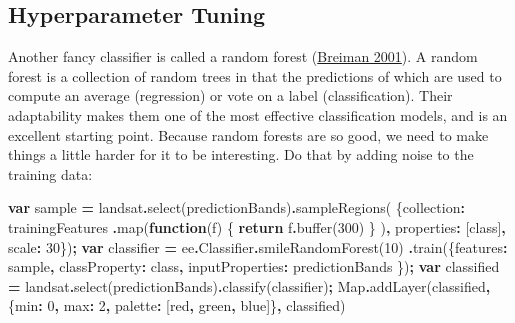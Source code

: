 \documentclass[
]{article}
\newenvironment{Shaded}{\begin{snugshade}}{\end{snugshade}}
\newcommand{\AttributeTok}[1]{\textcolor[rgb]{0.77,0.63,0.00}{#1}}
\newcommand{\BuiltInTok}[1]{#1}
\newcommand{\ControlFlowTok}[1]{\textcolor[rgb]{0.13,0.29,0.53}{\textbf{#1}}}
\newcommand{\DataTypeTok}[1]{\textcolor[rgb]{0.13,0.29,0.53}{#1}}
\newcommand{\DecValTok}[1]{\textcolor[rgb]{0.00,0.00,0.81}{#1}}
\newcommand{\FunctionTok}[1]{\textcolor[rgb]{0.00,0.00,0.00}{#1}}
\newcommand{\KeywordTok}[1]{\textcolor[rgb]{0.13,0.29,0.53}{\textbf{#1}}}
\newcommand{\NormalTok}[1]{#1}
\newcommand{\OperatorTok}[1]{\textcolor[rgb]{0.81,0.36,0.00}{\textbf{#1}}}
\newcommand{\StringTok}[1]{\textcolor[rgb]{0.31,0.60,0.02}{#1}}
\begin{document}
\hypertarget{hyperparameter-tuning}{%
\subsection{Hyperparameter Tuning}\label{hyperparameter-tuning}}

Another fancy classifier is called a random forest (\href{https://link.springer.com/article/10.1023/A:1010933404324}{Breiman 2001}). A random forest is a collection of random trees in that the predictions of which are used to compute an average (regression) or vote on a label (classification). Their adaptability makes them one of the most effective classification models, and is an excellent starting point. Because random forests are so good, we need to make things a little harder for it to be interesting. Do that by adding noise to the training data:

\begin{Shaded}
\begin{Highlighting}[]
\KeywordTok{var}\NormalTok{ sample }\OperatorTok{=}\NormalTok{ landsat}\OperatorTok{.}\FunctionTok{select}\NormalTok{(predictionBands)}\OperatorTok{.}\FunctionTok{sampleRegions}\NormalTok{(}
\NormalTok{  \{}\DataTypeTok{collection}\OperatorTok{:}\NormalTok{ trainingFeatures}
   \OperatorTok{.}\FunctionTok{map}\NormalTok{(}\KeywordTok{function}\NormalTok{(f) \{}
    \ControlFlowTok{return}\NormalTok{  f}\OperatorTok{.}\FunctionTok{buffer}\NormalTok{(}\DecValTok{300}\NormalTok{)}
\NormalTok{   \}}
\NormalTok{       )}\OperatorTok{,} \DataTypeTok{properties}\OperatorTok{:}\NormalTok{ [}\StringTok{\textquotesingle{}class\textquotesingle{}}\NormalTok{]}\OperatorTok{,} \DataTypeTok{scale}\OperatorTok{:} \DecValTok{30}\NormalTok{\})}\OperatorTok{;}  
\KeywordTok{var}\NormalTok{ classifier }\OperatorTok{=}\NormalTok{  ee}\OperatorTok{.}\AttributeTok{Classifier}\OperatorTok{.}\FunctionTok{smileRandomForest}\NormalTok{(}\DecValTok{10}\NormalTok{)}
                \OperatorTok{.}\FunctionTok{train}\NormalTok{(\{}\DataTypeTok{features}\OperatorTok{:}\NormalTok{ sample}\OperatorTok{,}
                \DataTypeTok{classProperty}\OperatorTok{:} \StringTok{\textquotesingle{}class\textquotesingle{}}\OperatorTok{,}
                \DataTypeTok{inputProperties}\OperatorTok{:}\NormalTok{ predictionBands}
\NormalTok{               \})}\OperatorTok{;}
\KeywordTok{var}\NormalTok{ classified }\OperatorTok{=}\NormalTok{  landsat}\OperatorTok{.}\FunctionTok{select}\NormalTok{(predictionBands)}\OperatorTok{.}\FunctionTok{classify}\NormalTok{(classifier)}\OperatorTok{;}   \BuiltInTok{Map}\OperatorTok{.}\FunctionTok{addLayer}\NormalTok{(classified}\OperatorTok{,}\NormalTok{ \{}\DataTypeTok{min}\OperatorTok{:} \DecValTok{0}\OperatorTok{,} \DataTypeTok{max}\OperatorTok{:} \DecValTok{2}\OperatorTok{,}  \DataTypeTok{palette}\OperatorTok{:} 
\NormalTok{             [}\StringTok{\textquotesingle{}red\textquotesingle{}}\OperatorTok{,} \StringTok{\textquotesingle{}green\textquotesingle{}}\OperatorTok{,} \StringTok{\textquotesingle{}blue\textquotesingle{}}\NormalTok{]\}}\OperatorTok{,} \StringTok{\textquotesingle{}classified\textquotesingle{}}\NormalTok{)                                                                     }
\end{Highlighting}
\end{Shaded}
\end{document}
